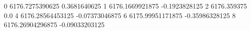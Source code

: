 0 6176.7275390625 0.3681640625
1 6176.1669921875 -0.1923828125
2 6176.359375 0.0
4 6176.28564453125 -0.07373046875
6 6175.99951171875 -0.35986328125
8 6176.26904296875 -0.09033203125
